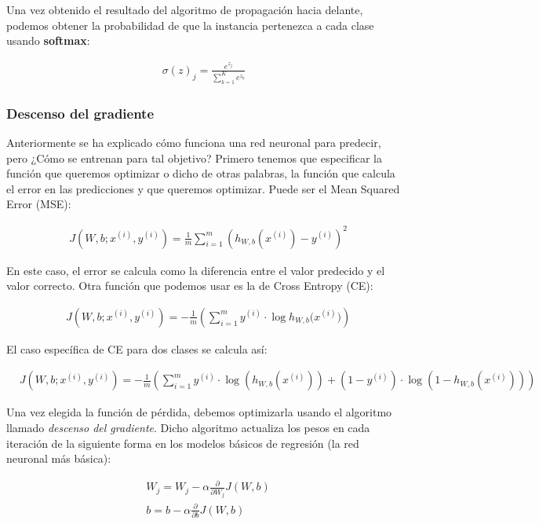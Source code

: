 Una vez obtenido el resultado del algoritmo de propagación hacia delante, podemos obtener la probabilidad de que la instancia pertenezca a cada clase usando \textbf{softmax}:

\begin{align*}
\sigma (z)_j = \frac{e^{z_j}}{\sum^{K}_{k=1} e^{z_k}}
\end{align*}

\subsubsection{Descenso del gradiente}

Anteriormente se ha explicado cómo funciona una red neuronal para predecir, pero ¿Cómo se entrenan para tal objetivo? Primero tenemos que especificar la función que queremos optimizar o dicho de otras palabras, la función que calcula el error en las predicciones y que queremos optimizar. Puede ser el Mean Squared Error (MSE):

\begin{align*}
	&J(W,b;x^{(i)},y^{(i)}) = \frac{1}{m} \sum^m_{i=1} (h_{W,b}(x^{(i)}) - y^{(i)} )^2
\end{align*}

En este caso, el error se calcula como la diferencia entre el valor predecido y el valor correcto. Otra función que podemos usar es la de Cross Entropy (CE):

\begin{align*}
	&J(W,b;x^{(i)},y^{(i)}) = - \frac{1}{m}\left(\sum^m_{i=1} y^{(i)} \cdot \log{h_{W,b}(x^{(i)}})\right)
\end{align*}

El caso específica de CE para dos clases se calcula así:

\begin{align*}
	&J(W,b;x^{(i)},y^{(i)}) = - \frac{1}{m} \left( \sum^m_{i=1} y^{(i)} \cdot \log (h_{W,b}(x^{(i)})) + (1 - y^{(i)}) \cdot \log (1 - h_{W,b}(x^{(i)})) \right)
\end{align*}

Una vez elegida la función de pérdida, debemos optimizarla usando el algoritmo llamado \textit{descenso del gradiente}. Dicho algoritmo actualiza los pesos en cada iteración de la siguiente forma en los modelos básicos de regresión (la red neuronal más básica):

\begin{align*}
	&W_j = W_j - \alpha \frac{\partial}{\partial W_j} J(W,b)\\
	&b = b - \alpha \frac{\partial}{\partial b} J(W,b)\\
\end{align*}

